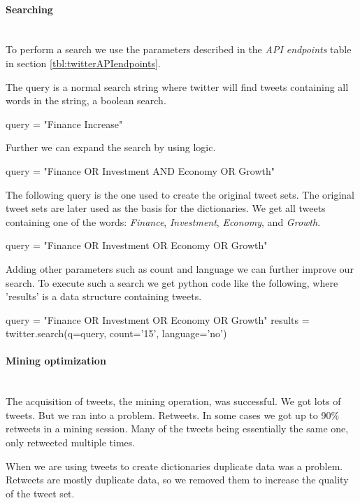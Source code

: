 \paragraph{Searching}
\hspace{0pt}\\
To perform a search we use the parameters described in the \textit{API
endpoints} table in section \ref{tbl:twitterAPIendpoints}.

The query is a normal search string where twitter will
find tweets containing all words in the string, a boolean search. 
\begin{python}
query = "Finance Increase"
\end{python}

Further we can expand the search by using logic. 
\begin{python}
query = "Finance OR Investment AND Economy OR Growth"
\end{python}

The following query is the one used to create the original tweet sets. The
original tweet sets are later used as the basis for the dictionaries.
We get all tweets containing one of the words: \textit{Finance}, \textit{Investment}, \textit{Economy}, and \textit{Growth}.
\begin{python}
query = "Finance OR Investment OR Economy OR Growth"
\end{python}

Adding other parameters such as count and language we can further improve our
search. To execute such a search we get python code like the following, where
'results' is a data structure containing tweets.
\begin{python}
query = "Finance OR Investment OR Economy OR Growth"
results = twitter.search(q=query, count='15', language='no')
\end{python}
%

\paragraph{Mining optimization}
\hspace{0pt}\\
The acquisition of tweets, the mining operation, was successful. We got lots
of tweets. But we ran into a problem. Retweets. In some cases we got up to 90\%
retweets in a mining session. Many of the tweets being essentially the same
one, only retweeted multiple times. 

When we are using tweets to create dictionaries duplicate data was a problem.
Retweets are mostly duplicate data, so we removed them to increase the quality
of the tweet set.

